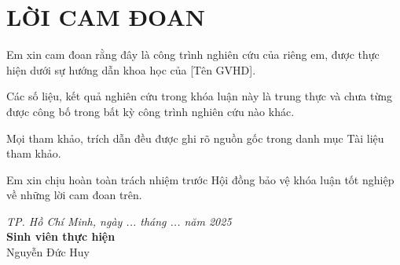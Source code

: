 \chapter*{LỜI CAM ĐOAN}

Em xin cam đoan rằng đây là công trình nghiên cứu của riêng em, được thực hiện dưới sự hướng dẫn khoa học của [Tên GVHD].

Các số liệu, kết quả nghiên cứu trong khóa luận này là trung thực và chưa từng được công bố trong bất kỳ công trình nghiên cứu nào khác.

Mọi tham khảo, trích dẫn đều được ghi rõ nguồn gốc trong danh mục Tài liệu tham khảo.

Em xin chịu hoàn toàn trách nhiệm trước Hội đồng bảo vệ khóa luận tốt nghiệp về những lời cam đoan trên.

\vspace{2cm}
\begin{flushright}
\textit{TP. Hồ Chí Minh, ngày ... tháng ... năm 2025}\\
\vspace{1cm}
\textbf{Sinh viên thực hiện}\\
\vspace{1.5cm}
Nguyễn Đức Huy
\end{flushright}
